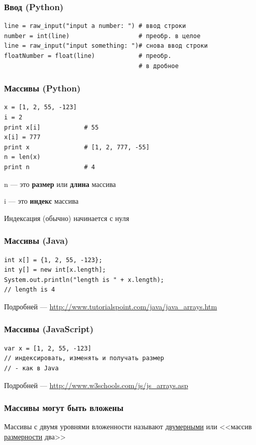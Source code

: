 {\begin{frame}[fragile]
  \frametitle{Ввод (Python)}
  \begin{verbatim}
line = raw_input("input a number: ") # ввод строки
number = int(line)                   # преобр. в целое
line = raw_input("input something: ")# снова ввод строки
floatNumber = float(line)            # преобр.
                                     # в дробное
  \end{verbatim}
\end{frame}

\begin{frame}[fragile]
  \frametitle{Массивы (Python)}
  \begin{verbatim}
x = [1, 2, 55, -123]
i = 2
print x[i]            # 55
x[i] = 777
print x               # [1, 2, 777, -55]
n = len(x)
print n               # 4
  \end{verbatim}

  \vspace{0.5cm}
  n --- это \textbf{размер} или \textbf{длина} массива

  i --- это \textbf{индекс} массива

  Индексация (обычно) начинается с нуля
\end{frame}

\begin{frame}[fragile]
  \frametitle{Массивы (Java)}
  \begin{verbatim}
int x[] = {1, 2, 55, -123};
int y[] = new int[x.length];
System.out.println("length is " + x.length);
// length is 4
  \end{verbatim}

  \vspace{0.5cm}
  Подробней --- \url{http://www.tutorialspoint.com/java/java\_arrays.htm}
\end{frame}

\begin{frame}[fragile]
  \frametitle{Массивы (JavaScript)}
  \begin{verbatim}
var x = [1, 2, 55, -123]
// индексировать, изменять и получать размер
// - как в Java
  \end{verbatim}

  \vspace{0.5cm}
  Подробней --- \url{http://www.w3schools.com/js/js\_arrays.asp}
\end{frame}

\begin{frame}[fragile]
  \frametitle{Массивы могут быть вложены}
  Массивы с двумя уровнями вложенности называют \underline{двумерными} или
  <<массив \underline{размерности} два>>


\end{frame}}
